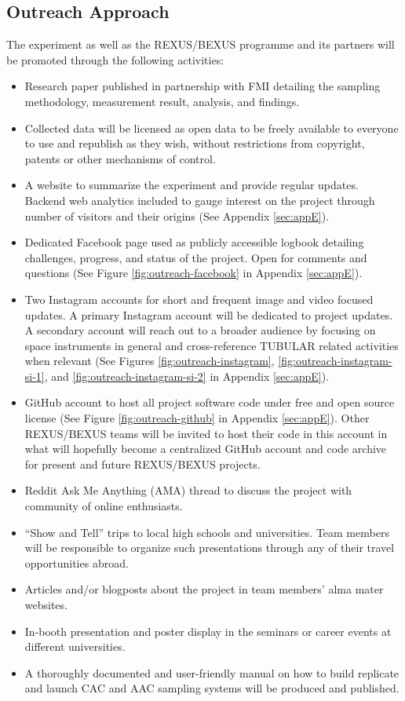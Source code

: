 
\subsection{Outreach Approach}

The experiment as well as the REXUS/BEXUS programme and its partners will be promoted through the following activities:

\begin{itemize}
\item Research paper published in partnership with FMI detailing the sampling methodology, measurement result, analysis, and findings.
\item Collected data will be licensed as open data to be freely available to everyone to use and republish as they wish, without restrictions from copyright, patents or other mechanisms of control.
\item A website to summarize the experiment and provide regular updates. Backend web analytics included to gauge interest on the project through number of visitors and their origins (See Appendix \ref{sec:appE}).
\item Dedicated Facebook page used as publicly accessible logbook detailing challenges, progress, and status of the project. Open for comments and questions (See Figure \ref{fig:outreach-facebook} in Appendix \ref{sec:appE}).
\item Two Instagram accounts for short and frequent image and video focused updates. A primary Instagram account will be dedicated to project updates. A secondary account will reach out to a broader audience by focusing on space instruments in general and cross-reference TUBULAR related activities when relevant (See Figures \ref{fig:outreach-instagram}, \ref{fig:outreach-instagram-si-1}, and \ref{fig:outreach-instagram-si-2} in Appendix \ref{sec:appE}).
\item GitHub account to host all project software code under free and open source license (See Figure \ref{fig:outreach-github} in Appendix \ref{sec:appE}). Other REXUS/BEXUS teams will be invited to host their code in this account in what will hopefully become a centralized GitHub account and code archive for present and future REXUS/BEXUS projects.
\item Reddit Ask Me Anything (AMA) thread to discuss the project with community of online enthusiasts.
\item\enquote{Show and Tell} trips to local high schools and universities. Team members will be responsible to organize such presentations through any of their travel opportunities abroad.
\item Articles and/or blogposts about the project in team members' alma mater websites.
\item In-booth presentation and poster display in the seminars or career events at different universities. 
\item A thoroughly documented and user-friendly manual on how to build replicate and launch CAC and AAC sampling systems will be produced and published.
\end{itemize}